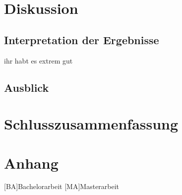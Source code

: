 \documentclass[12pt,a4paper,bibliography=totoc,listof=totoc]{scrartcl}
\begin{document}
\section{Diskussion}

\subsection{Interpretation der Ergebnisse}
ihr habt es extrem gut

\subsection{Ausblick}

\pagebreak
\section{Schlusszusammenfassung}

\pagebreak



\appendix
\section{Anhang}

\pagebreak



\begin{acronym}[KDE]
[BA]{Bachelorarbeit}
[MA]{Masterarbeit}
\end{acronym}

\pagebreak
\end{document}
